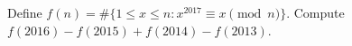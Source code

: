 Define $ f(n)=\#\{1\le x\le n:x^{2017}\equiv x\pmod n\}$. Compute $ f(2016)-f(2015)+f(2014)-f(2013)$.
